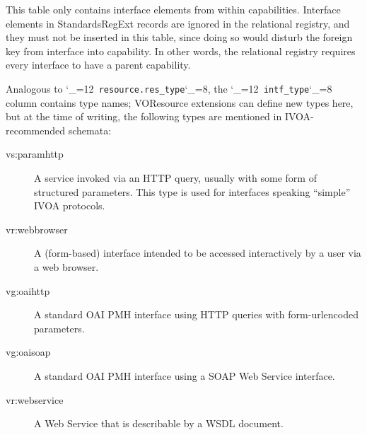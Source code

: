 \documentclass[11pt,a4paper]{ivoa}
\makeatletter
\def\rtent#1{\texttt{\color{rtcolor}\verb|#1|}}
\def\makeunderscoreletter{\catcode`\_=12}
\def\makeunderscoresubscript{\catcode`\_=8}
\def\rtent{\makeunderscoreletter\relax\rt@nt}
\def\rt@nt#1{\texttt{\color{rtcolor} #1}\makeunderscoresubscript{}}
\makeatother
\begin{document}
This table only contains interface elements from within capabilities.
Interface elements in StandardsRegExt records are ignored in the
relational registry,
and they must not be inserted in this table, since doing so would disturb
the foreign key from interface into capability.  In other words,
the relational registry requires every interface to have a parent capability.

Analogous to \rtent{resource.res_type}, the
\rtent{intf_type} column contains type names; VOResource extensions
can define new types here, but at the time of writing, the following
types are mentioned in IVOA-recommended schemata:


\begin{description}
\item[vs:paramhttp]A service invoked via an HTTP query, usually with some form of
structured parameters. This type is used for interfaces speaking
``simple'' IVOA protocols.
\item[vr:webbrowser]A (form-based) interface intended to be accessed interactively by a
user via a web browser.
\item[vg:oaihttp]A standard OAI PMH interface using HTTP queries with form-urlencoded
parameters.
\item[vg:oaisoap]A standard OAI PMH interface using a SOAP Web Service
interface.
\item[vr:webservice]A Web Service that is describable by a WSDL document.

\end{description}


\end{document}
